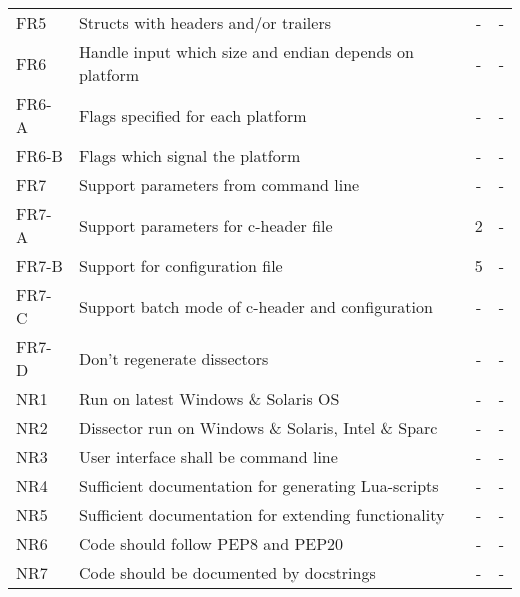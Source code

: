 \begin{table}[ht]
\begin{tabularx}{\textwidth}{l X c c}
	\addlinespace
	FR5 & Structs with headers and/or trailers & - & - \\
	\addlinespace
	FR6 & Handle input which size and endian depends on platform & - & - \\
	FR6-A & Flags specified for each platform & - & - \\
	FR6-B & Flags which signal the platform & - & - \\
	\addlinespace
	FR7 & Support parameters from command line & - & - \\
	FR7-A & Support parameters for c-header file & 2 & - \\
	FR7-B & Support for configuration file & 5 & - \\
	FR7-C & Support batch mode of c-header and configuration & - & - \\
	FR7-D & Don't regenerate dissectors & - & - \\
	\addlinespace
	NR1 & Run on latest Windows \& Solaris OS & - & - \\
	NR2 & Dissector run on Windows \& Solaris, Intel \& Sparc & - & - \\
	NR3 & User interface shall be command line & - & - \\
	NR4 & Sufficient documentation for generating Lua-scripts & - & - \\
	NR5 & Sufficient documentation for extending functionality & - & - \\
	NR6 & Code should follow PEP8 and PEP20 & - & - \\
	NR7 & Code should be documented by docstrings & - & - \\
	\bottomrule
\end{tabularx}
\end{table}

